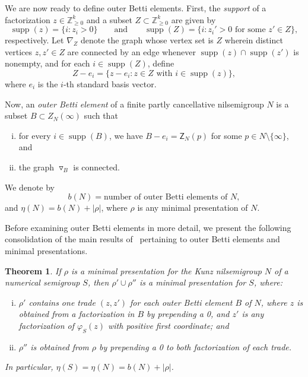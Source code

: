 \documentclass[10pt,a4paper]{amsart}
\newcommand\ZZ{\mathbb{Z}}
\DeclareMathOperator\supp{supp}
\newtheorem{thm}{Theorem}[section]
\begin{document}
We are now ready to define outer Betti elements.  First, the \emph{support} of a factorization $z \in \ZZ_{\ge 0}^k$ and a subset $Z \subset \ZZ_{\ge 0}^k$ are given by
$$
\supp(z) = \{i : z_i > 0\}
\qquad \text{and} \qquad
\supp(Z) = \{i : z_i' > 0 \text{ for some } z' \in Z\},
$$
respectively.  Let $\nabla_Z$ denote the graph whose vertex set is $Z$ wherein distinct vertices $z, z' \in Z$ are connected by an edge whenever $\supp(z) \cap \supp(z')$ is nonempty, and for each $i \in \supp(Z)$, define 
$$Z - e_i = \{ z - e_i :  z \in Z \text{ with } i \in \supp(z) \},$$
where $e_i$ is the $i$-th standard basis vector.  

Now, an \emph{outer Betti element} of a finite partly cancellative nilsemigroup $N$ is a subset $B \subset Z_N(\infty)$  such that
\begin{enumerate}[(i)]
\item 
for every $i \in \supp(B)$, we have $B - e_i = \mathsf Z_N(p)$ for some $p \in N \setminus \{\infty\}$, and

\item 
the graph $\triangledown_B$ is connected.
\end{enumerate}
We denote by 
$$b(N) = \text{number of outer Betti elements of } N,$$
and $\eta(N) = b(N) + |\rho|$, where $\rho$ is any minimal presentation of $N$.  

\setcounter{section}{2}\setcounter{thm}{3}
Before examining outer Betti elements in more detail, we present the following consolidation of the main results of~\cite[Section~5]{kunzfaces3} pertaining to outer Betti elements and minimal presentations.  

\begin{thm}\label{t:kunzfaces3}
If $\rho$ is a minimal presentation for the Kunz nilsemigroup $N$ of a numerical semigroup $S$, then $\rho' \cup \rho''$ is a minimal presentation for $S$, where:
\begin{enumerate}[(i)]
\item
$\rho'$ contains one trade $(z, z')$ for each outer Betti element $B$ of $N$, where $z$ is obtained from a factorization in $B$ by prepending a 0, and $z'$ is any factorization of $\varphi_S(z)$ with positive first coordinate; and

\item 
$\rho''$ is obtained from $\rho$ by prepending a 0 to both factorization of each trade.  

\end{enumerate}
In particular, $\eta(S) = \eta(N) = b(N) + |\rho|$.
\end{thm}
\end{document}
